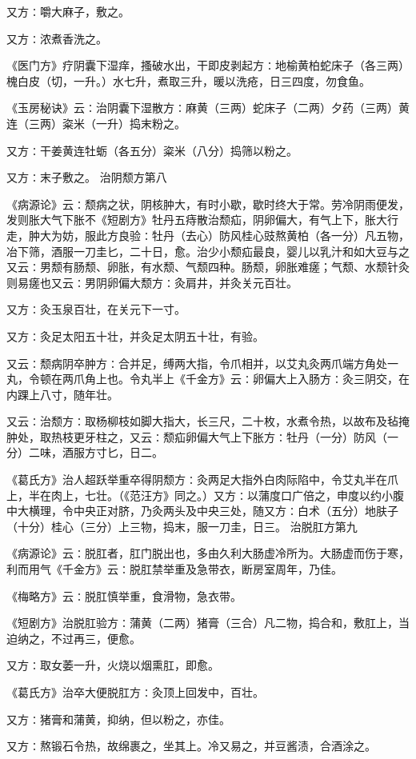 \documentclass[a4paper,12pt,UTF8,twoside]{ctexbook}
\begin{document}
又方∶嚼大麻子，敷之。

又方∶浓煮香洗之。

《医门方》疗阴囊下湿痒，搔破水出，干即皮剥起方∶地榆黄柏蛇床子（各三两）槐白皮（切，一升。）水七升，煮取三升，暖以洗疮，日三四度，勿食鱼。

《玉房秘诀》云∶治阴囊下湿散方∶麻黄（三两）蛇床子（二两）夕药（三两）黄连（三两）粢米（一升）捣末粉之。

又方∶干姜黄连牡蛎（各五分）粢米（八分）捣筛以粉之。

又方∶末子敷之。
治阴颓方第八

《病源论》云∶颓病之状，阴核肿大，有时小歇，歇时终大于常。劳冷阴雨便发，发则胀大气下胀不《短剧方》牡丹五痔散治颓疝，阴卵偏大，有气上下，胀大行走，肿大为妨，服此方良验∶牡丹（去心）防风桂心豉熬黄柏（各一分）凡五物，冶下筛，酒服一刀圭匕，二十日，愈。治少小颓疝最良，婴儿以乳汁和如大豆与之又云∶男颓有肠颓、卵胀，有水颓、气颓四种。肠颓，卵胀难瘥；气颓、水颓针灸则易瘥也又云∶男阴卵偏大颓方∶灸肩井，并灸关元百壮。

又方∶灸玉泉百壮，在关元下一寸。

又方∶灸足太阳五十壮，并灸足太阴五十壮，有验。

又云∶颓病阴卒肿方∶合并足，缚两大指，令爪相并，以艾丸灸两爪端方角处一丸，令顿在两爪角上也。令丸半上《千金方》云∶卵偏大上入肠方∶灸三阴交，在内踝上八寸，随年壮。

又云∶治颓方∶取杨柳枝如脚大指大，长三尺，二十枚，水煮令热，以故布及毡掩肿处，取热枝更牙柱之，又云∶颓疝卵偏大气上下胀方∶牡丹（一分）防风（一分）二味，酒服方寸匕，日二。

《葛氏方》治人超跃举重卒得阴颓方∶灸两足大指外白肉际陷中，令艾丸半在爪上，半在肉上，七壮。（《范汪方》同之。）又方∶以蒲度口广倍之，申度以约小腹中大横理，令中央正对脐，乃灸两头及中央三处，随又方∶白术（五分）地肤子（十分）桂心（三分）上三物，捣末，服一刀圭，日三。
治脱肛方第九

《病源论》云∶脱肛者，肛门脱出也，多由久利大肠虚冷所为。大肠虚而伤于寒，利而用气《千金方》云∶脱肛禁举重及急带衣，断房室周年，乃佳。

《梅略方》云∶脱肛慎举重，食滑物，急衣带。

《短剧方》治脱肛验方∶蒲黄（二两）猪膏（三合）凡二物，捣合和，敷肛上，当迫纳之，不过再三，便愈。

又方∶取女萎一升，火烧以烟熏肛，即愈。

《葛氏方》治卒大便脱肛方∶灸顶上回发中，百壮。

又方∶猪膏和蒲黄，抑纳，但以粉之，亦佳。

又方∶熬锻石令热，故绵裹之，坐其上。冷又易之，并豆酱渍，合酒涂之。
\end{document}
